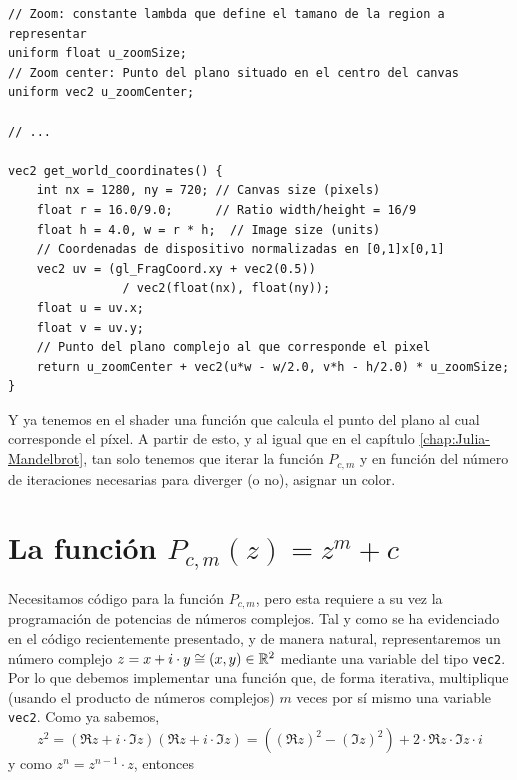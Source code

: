 \begin{lstlisting}
// Zoom: constante lambda que define el tamano de la region a representar
uniform float u_zoomSize;
// Zoom center: Punto del plano situado en el centro del canvas
uniform vec2 u_zoomCenter;

// ... 

vec2 get_world_coordinates() {
    int nx = 1280, ny = 720; // Canvas size (pixels)
    float r = 16.0/9.0;      // Ratio width/height = 16/9
    float h = 4.0, w = r * h;  // Image size (units) 
    // Coordenadas de dispositivo normalizadas en [0,1]x[0,1]
    vec2 uv = (gl_FragCoord.xy + vec2(0.5)) 
                / vec2(float(nx), float(ny));
    float u = uv.x;
    float v = uv.y;
    // Punto del plano complejo al que corresponde el pixel
    return u_zoomCenter + vec2(u*w - w/2.0, v*h - h/2.0) * u_zoomSize;
}
\end{lstlisting}


Y ya tenemos en el shader una función que calcula el punto del plano al cual corresponde el píxel. A partir de esto, y al igual que en el capítulo \ref{chap:Julia-Mandelbrot}, tan solo tenemos que iterar la función $P_{c,m}$ y en función del número de iteraciones necesarias para diverger (o no), asignar un color.

\section{La función $P_{c,m}(z)=z^m+c$}

Necesitamos código para la función $P_{c,m}$, pero esta requiere a su vez la programación de potencias de números complejos. Tal y como se ha evidenciado en el código recientemente presentado, y de manera natural, representaremos un número complejo $z=x+i\cdot y\cong (x,y)\in\mathbb{R}^2$ mediante una variable del tipo \verb|vec2|. Por lo que debemos implementar una función que, de forma iterativa, multiplique (usando el producto de números complejos) $m$ veces por sí mismo una variable \verb|vec2|. Como ya sabemos,
$$
z^2 = (\Re z+i\cdot \Im z)(\Re z+i\cdot \Im z) = ((\Re z)^2-(\Im z)^2) + 2\cdot\Re z\cdot\Im z\cdot i
$$
y como $z^n = z^{n-1}\cdot z$, entonces

